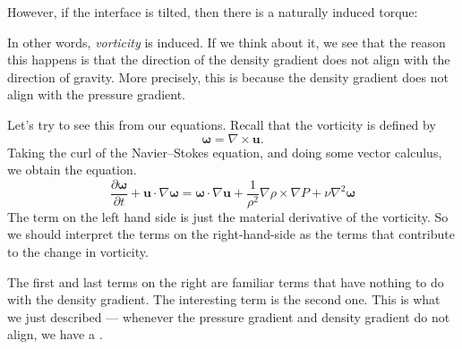 \documentclass[a4paper]{article}
\begin{document}
\begin{center}
\end{center}
However, if the interface is tilted, then there is a naturally induced torque:
\begin{center}
\end{center}
In other words, \emph{vorticity} is induced. If we think about it, we see that the reason this happens is that the direction of the density gradient does not align with the direction of gravity. More precisely, this is because the density gradient does not align with the pressure gradient.

Let's try to see this from our equations. Recall that the vorticity is defined by\index{$\boldsymbol\omega$}
\[
  \boldsymbol\omega = \nabla \times \mathbf{u}.
\]
Taking the curl of the Navier--Stokes equation, and doing some vector calculus, we obtain the equation.
\[
  \frac{\partial \boldsymbol\omega}{\partial t} + \mathbf{u} \cdot \nabla \boldsymbol\omega = \boldsymbol\omega \cdot \nabla \mathbf{u} + \frac{1}{\rho^2}\nabla \rho \times \nabla P + \nu \nabla^2 \boldsymbol\omega
\]
The term on the left hand side is just the material derivative of the vorticity. So we should interpret the terms on the right-hand-side as the terms that contribute to the change in vorticity.

The first and last terms on the right are familiar terms that have nothing to do with the density gradient. The interesting term is the second one. This is what we just described --- whenever the pressure gradient and density gradient do not align, we have a . %
\end{document}
